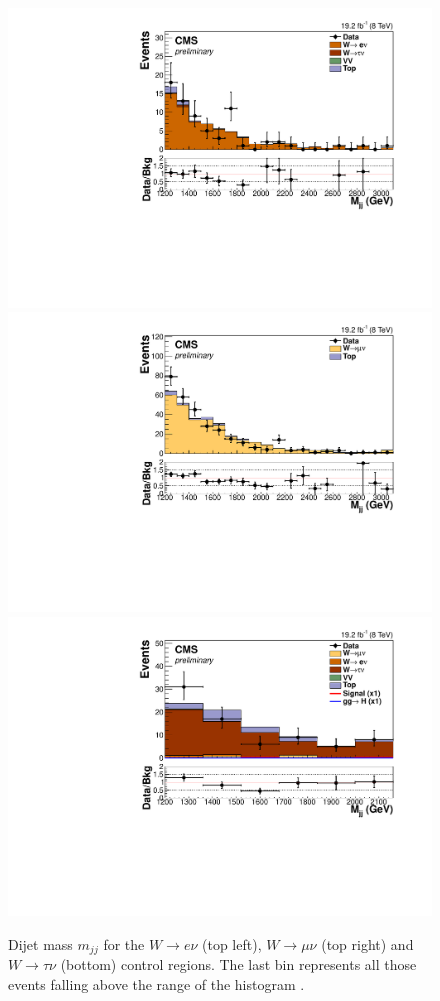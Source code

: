 \begin{figure}[!htb]
  \begin{center}
    \includegraphics[width=.49\textwidth]{Chapter07/Images/output_sigreg/enu_dijet_M.pdf}
    \includegraphics[width=.49\textwidth]{Chapter07/Images/output_sigreg/munu_dijet_M.pdf} \\
    \includegraphics[width=.49\textwidth]{Chapter07/Images/output_sigreg/taunu_dijet_M.pdf}
    \caption{Dijet mass $m_{jj}$ for the $W\rightarrow e\nu$ (top left), $W\rightarrow\mu\nu$ (top right) and $W\rightarrow\tau\nu$ (bottom) control regions. The last bin represents all those events falling above the range of the histogram \cite{ARTICLE:CMSVBFHiggsInvisibleParkedAnalysisPAS}.}
   \label{fig:wmjjcontplots}
  \end{center}
\end{figure}
% 
